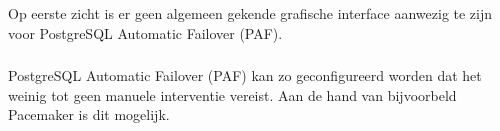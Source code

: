 Op eerste zicht is er geen algemeen gekende grafische interface aanwezig te zijn voor PostgreSQL Automatic Failover (PAF).

\subsubsection{}
\label{subsubsec:Beperkte manuele interventie}

PostgreSQL Automatic Failover (PAF) kan zo geconfigureerd worden dat het weinig tot geen manuele interventie vereist. Aan de hand van bijvoorbeld Pacemaker is dit mogelijk.
